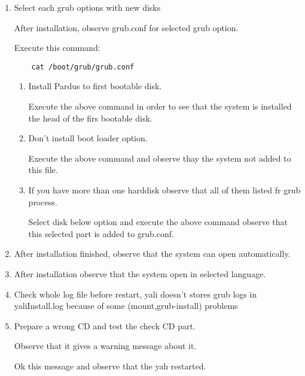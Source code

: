 \documentclass[a4paper,10pt]{article}
\begin{document}
\begin{enumerate}
\item Select each grub options with new disks

After installation, observe grub.conf for selected grub option.

Execute this command:
   \begin{verbatim}
    cat /boot/grub/grub.conf 
   \end{verbatim}

    \begin{enumerate}
        \item Install Pardus to first bootable disk.

        Execute the above command in order to see that the system is installed the head of the firs bootable disk.
        \item Don't install boot loader option.

        Execute the above command and observe thay the system not added to this file.

        \item If you have more than one harddisk observe that all of them listed fr grub process.
            
            Select disk below option and execute the above command observe that this selected part is added to grub.conf.
    \end{enumerate}

\item  After installation finished, observe that the system can open automatically.

\item After installation observe that the system open in selected language.

\item Check whole log file before restart, yali doesn't stores grub logs in yaliInstall.log because of some (mount,grub-install) problems

\item Prepare a wrong CD and test the check CD part.

Observe that it gives a warning message about it.

Ok this message and observe that the yalı restarted.

\end{enumerate}
\end{document}
